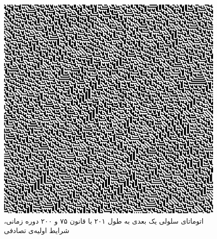 \documentclass[11pt, a4paper]{article}
\begin{document}
\begin{figure}[!tbp]
  \begin{minipage}[b]{0.3\textwidth}
    \includegraphics[width=\textwidth]{q3-75-rand}
    \caption{اتوماتای سلولی یک بعدی به طول ۲۰۱ با قانون ۷۵ و ۲۰۰ دوره زمانی، شرایط اولیه‌ی تصادفی}
    \label{fig:q3-75-rand}
  \end{minipage}
\end{figure}

\section{\textbf{}}
\end{document}
